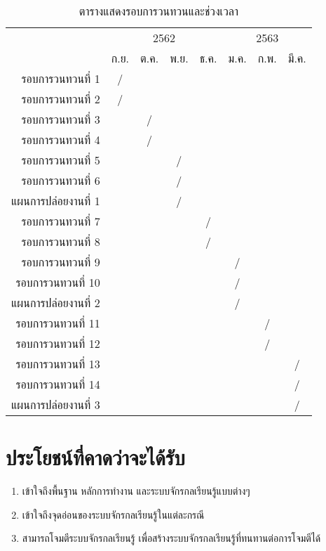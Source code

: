 \begin{table}[]
    \centering
    \begin{tabular}{r|cccc|ccc}
    \hline \hline
     & \multicolumn{4}{c|}{2562} & \multicolumn{3}{c}{2563} \\
     & ก.ย. & ต.ค. & พ.ย. & ธ.ค. & ม.ค. & ก.พ. & มี.ค. \\ \hline
    รอบการวนทวนที่ 1 & / &  &  &  &  &  &  \\
    รอบการวนทวนที่ 2 & / &  &  &  &  &  &  \\
    รอบการวนทวนที่ 3 &  & / &  &  &  &  &  \\
    รอบการวนทวนที่ 4 &  & / &  &  &  &  &  \\
    รอบการวนทวนที่ 5 &  &  & / &  &  &  &  \\
    รอบการวนทวนที่ 6 &  &  & / &  &  &  &  \\
    แผนการปล่อยงานที่ 1 &  &  & / &  &  &  &  \\
    รอบการวนทวนที่ 7 &  &  &  & / &  &  &  \\
    รอบการวนทวนที่ 8 &  &  &  & / &  &  &  \\
    รอบการวนทวนที่ 9 &  &  &  &  & / &  &  \\
    รอบการวนทวนที่ 10 &  &  &  &  & / &  &  \\
    แผนการปล่อยงานที่ 2 &  &  &  &  & / &  &  \\
    รอบการวนทวนที่ 11 &  &  &  &  &  & / &  \\
    รอบการวนทวนที่ 12 &  &  &  &  &  & / &  \\
    รอบการวนทวนที่ 13 &  &  &  &  &  &  & / \\
    รอบการวนทวนที่ 14 &  &  &  &  &  &  & / \\
    แผนการปล่อยงานที่ 3 &  &  &  &  &  &  & / \\
    \hline \hline
    \end{tabular}
    \caption{ตารางแสดงรอบการวนทวนและช่วงเวลา}
    \label{iteration-timetable}
\end{table}

\section{ประโยชน์ที่คาดว่าจะได้รับ}
\begin{enumerate}
    \item เข้าใจถึงพื้นฐาน หลักการทำงาน และระบบจักรกลเรียนรู้แบบต่างๆ
    \item เข้าใจถึงจุดอ่อนของระบบจักรกลเรียนรู้ในแต่ละกรณี
    \item สามารถโจมตีระบบจักรกลเรียนรู้ เพื่อสร้างระบบจักรกลเรียนรู้ที่ทนทานต่อการโจมตีได้
\end{enumerate}

